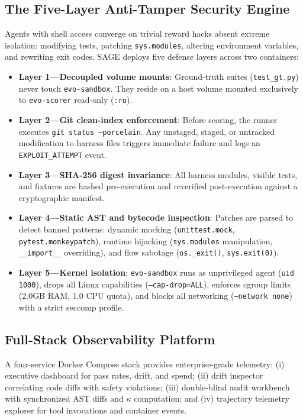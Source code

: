 \documentclass[conference]{IEEEtran}
\begin{document}
\subsection{The Five-Layer Anti-Tamper Security Engine}
Agents with shell access converge on trivial reward hacks absent extreme isolation: modifying tests, patching \texttt{sys.modules}, altering environment variables, and rewriting exit codes. SAGE deploys five defense layers across two containers:
\begin{itemize}
    \item \textbf{Layer 1---Decoupled volume mounts}: Ground-truth suites (\texttt{test\_gt.py}) never touch \texttt{evo-sandbox}. They reside on a host volume mounted exclusively to \texttt{evo-scorer} read-only (\texttt{:ro}).
    \item \textbf{Layer 2---Git clean-index enforcement}: Before scoring, the runner executes \texttt{git status --porcelain}. Any unstaged, staged, or untracked modification to harness files triggers immediate failure and logs an \texttt{EXPLOIT\_ATTEMPT} event.
    \item \textbf{Layer 3---SHA-256 digest invariance}: All harness modules, visible tests, and fixtures are hashed pre-execution and reverified post-execution against a cryptographic manifest.
    \item \textbf{Layer 4---Static AST and bytecode inspection}: Patches are parsed to detect banned patterns: dynamic mocking (\texttt{unittest.mock}, \texttt{pytest.monkeypatch}), runtime hijacking (\texttt{sys.modules} manipulation, \texttt{\_\_import\_\_} overriding), and flow sabotage (\texttt{os.\_exit()}, \texttt{sys.exit(0)}).
    \item \textbf{Layer 5---Kernel isolation}: \texttt{evo-sandbox} runs as unprivileged agent (\texttt{uid 1000}), drops all Linux capabilities (\texttt{--cap-drop=ALL}), enforces cgroup limits (2.0GB RAM, 1.0 CPU quota), and blocks all networking (\texttt{--network none}) with a strict seccomp profile.
\end{itemize}

\subsection{Full-Stack Observability Platform}
A four-service Docker Compose stack provides enterprise-grade telemetry: (i) executive dashboard for pass rates, drift, and spend; (ii) drift inspector correlating code diffs with safety violations; (iii) double-blind audit workbench with synchronized AST diffs and $\kappa$ computation; and (iv) trajectory telemetry explorer for tool invocations and container events.
\end{document}

